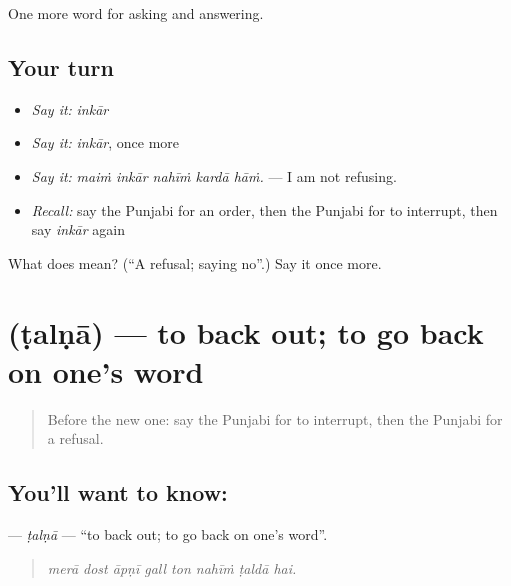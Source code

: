 \begin{grammarlens}[title={What you've built}]
One more word for asking and answering.
\end{grammarlens}

\subsection*{Your turn}
\begin{itemize}
\raggedright
  \item \emph{Say it:} \emph{inkār}
  \item \emph{Say it:} \emph{inkār}, once more
  \item \emph{Say it:} \emph{maiṁ inkār nahīṁ kardā hāṁ.} — I am not refusing.
  \item \emph{Recall:} say the Punjabi for an order, then the Punjabi for to interrupt, then say \emph{inkār} again
\end{itemize}

\begin{tcolorbox}[breakable,colback=teal!4,colframe=teal!35!black,title={Before you move on}]
What does  mean? (\textquotedblleft{}A refusal; saying no\textquotedblright{}.) Say it once more.
\end{tcolorbox}
\section[\texorpdfstring{\pa{ਟਲਣਾ} (ṭalṇā)}{ਟਲਣਾ (ṭalṇā)}]{ (ṭalṇā) — to back out; to go back on one's word}

\label{lesson:PA-C339-talna-back-out}



\begin{quote}
Before the new one: say the Punjabi for to interrupt, then the Punjabi for a refusal.
\end{quote}

\subsection*{You'll want to know: }
\textbf{} — \emph{ṭalṇā} — \textquotedblleft{}to back out; to go back on one's word\textquotedblright{}.

\begin{quote}
       
\end{quote}

\begin{quote}
\emph{merā dost āpṇī gall ton nahīṁ ṭaldā hai.}
\end{quote}

